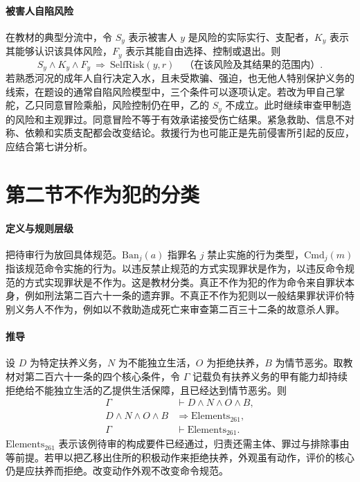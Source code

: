 \paragraph{被害人自陷风险}
在教材的典型分流中，令 $S_y$ 表示被害人 $y$ 是风险的实际实行、支配者，$K_y$ 表示其能够认识该具体风险，$F_y$ 表示其能自由选择、控制或退出。则
\[
S_y\land K_y\land F_y
   \ \Longrightarrow\ \mathrm{SelfRisk}(y,r)
   \quad\text{（在该风险及其结果的范围内）}.
\]
若熟悉河况的成年人自行决定入水，且未受欺骗、强迫，也无他人特别保护义务的线索，在题设的通常自陷风险模型中，三个条件可以逐项认定。若改为甲自己掌舵，乙只同意冒险乘船，风险控制仍在甲，乙的 $S_y$ 不成立。此时继续审查甲制造的风险和主观罪过。同意冒险不等于有效承诺接受伤亡结果。紧急救助、信息不对称、依赖和实质支配都会改变结论。救援行为也可能正是先前侵害所引起的反应，应结合第七讲分析。

\section{第二节\quad 不作为犯的分类}

\paragraph{定义与规则层级}
把待审行为放回具体规范。$\mathrm{Ban}_j(a)$ 指罪名 $j$ 禁止实施的行为类型，$\mathrm{Cmd}_j(m)$ 指该规范命令实施的行为。以违反禁止规范的方式实现罪状是作为，以违反命令规范的方式实现罪状是不作为。这是教材分类。真正不作为犯的作为命令来自罪状本身，例如刑法第二百六十一条的遗弃罪。不真正不作为犯则以一般结果罪状评价特别义务人不作为，例如以不救助造成死亡来审查第二百三十二条的故意杀人罪。

\paragraph{推导}
设 $D$ 为特定扶养义务，$N$ 为不能独立生活，$O$ 为拒绝扶养，$B$ 为情节恶劣。取教材对第二百六十一条的四个核心条件，令 $\Gamma$ 记载负有扶养义务的甲有能力却持续拒绝给不能独立生活的乙提供生活保障，且已经达到情节恶劣。则
\[
\begin{aligned}
\Gamma&\vdash D\land N\land O\land B,\\
D\land N\land O\land B&\Longrightarrow
     \mathrm{Elements}_{261},\\
\Gamma&\vdash \mathrm{Elements}_{261}.
\end{aligned}
\]
$\mathrm{Elements}_{261}$ 表示该例待审的构成要件已经通过，归责还需主体、罪过与排除事由等前提。若甲以把乙移出住所的积极动作来拒绝扶养，外观虽有动作，评价的核心仍是应扶养而拒绝。改变动作外观不改变命令规范。

